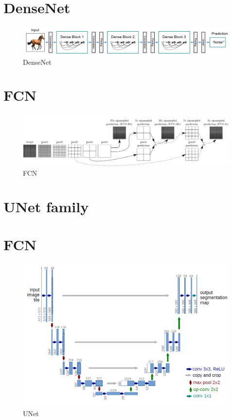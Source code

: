 \section{DenseNet}
\begin{figure}[H]
    \centering
    \includegraphics[width=14cm]{images/densenet.png}
    \caption{DenseNet}
    \label{fig:densenet}
\end{figure}

\section{FCN}
\begin{figure}[H]
    \centering
    \includegraphics[width=14cm]{images/fcns.png}
    \caption{FCN}
    \label{fig:fcn}
\end{figure}

\section{UNet family}
\section{FCN}
\begin{figure}[H]
    \centering
    \includegraphics[width=14cm]{images/unet.png}
    \caption{UNet}
    \label{fig:unet}
\end{figure}

